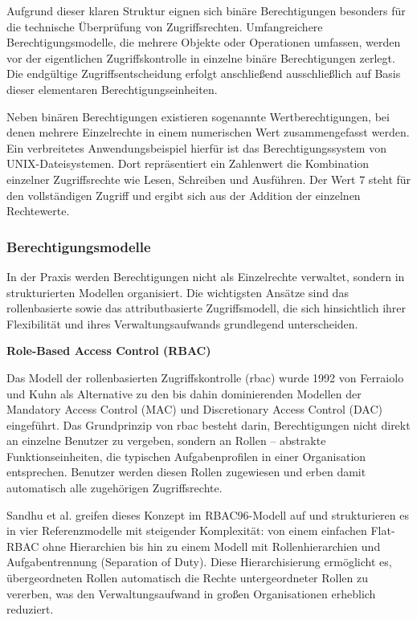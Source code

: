 Aufgrund dieser klaren Struktur eignen sich binäre Berechtigungen besonders für die
technische Überprüfung von Zugriffsrechten. Umfangreichere Berechtigungsmodelle, die
mehrere Objekte oder Operationen umfassen, werden vor der eigentlichen
Zugriffskontrolle in einzelne binäre Berechtigungen zerlegt. Die endgültige
Zugriffsentscheidung erfolgt anschließend ausschließlich auf Basis dieser elementaren
Berechtigungseinheiten.
\cite{tsolkas2017rollen,ferraiolo1992rbac}

Neben binären Berechtigungen existieren sogenannte Wertberechtigungen, bei
denen mehrere Einzelrechte in einem numerischen Wert zusammengefasst werden. Ein
verbreitetes Anwendungsbeispiel hierfür ist das Berechtigungssystem von
UNIX-Dateisystemen. Dort repräsentiert ein Zahlenwert die Kombination einzelner
Zugriffsrechte wie Lesen, Schreiben und Ausführen. Der Wert 7 steht für den
vollständigen Zugriff und ergibt sich aus der Addition der einzelnen Rechtewerte.
\cite{tsolkas2017rollen}

\subsubsection{Berechtigungsmodelle}

In der Praxis werden Berechtigungen nicht als Einzelrechte verwaltet, sondern in
strukturierten Modellen organisiert. Die wichtigsten Ansätze sind das rollenbasierte
sowie das attributbasierte Zugriffsmodell, die sich hinsichtlich ihrer Flexibilität
und ihres Verwaltungsaufwands grundlegend unterscheiden.
\cite{sandhu1996rbac,hu2014abac}

\textbf{Role-Based Access Control (RBAC)}

Das Modell der rollenbasierten Zugriffskontrolle (\acrshort{rbac}) wurde 1992 von Ferraiolo und
Kuhn als Alternative zu den bis dahin dominierenden Modellen der Mandatory Access
Control (MAC) und Discretionary Access Control (DAC) eingeführt. Das Grundprinzip
von \acrshort{rbac} besteht darin, Berechtigungen nicht direkt an einzelne Benutzer zu vergeben,
sondern an Rollen – abstrakte Funktionseinheiten, die typischen Aufgabenprofilen in
einer Organisation entsprechen. Benutzer werden diesen Rollen zugewiesen und erben
damit automatisch alle zugehörigen Zugriffsrechte.
\cite{ferraiolo1992rbac,sandhu1996rbac}

Sandhu et al. greifen dieses Konzept im RBAC96-Modell auf und strukturieren es in
vier Referenzmodelle mit steigender Komplexität: von einem einfachen Flat-RBAC ohne
Hierarchien bis hin zu einem Modell mit Rollenhierarchien und Aufgabentrennung
(Separation of Duty). Diese Hierarchisierung ermöglicht es, übergeordneten Rollen
automatisch die Rechte untergeordneter Rollen zu vererben, was den
Verwaltungsaufwand in großen Organisationen erheblich reduziert.
\cite{sandhu1996rbac,ferraiolo1992rbac}

